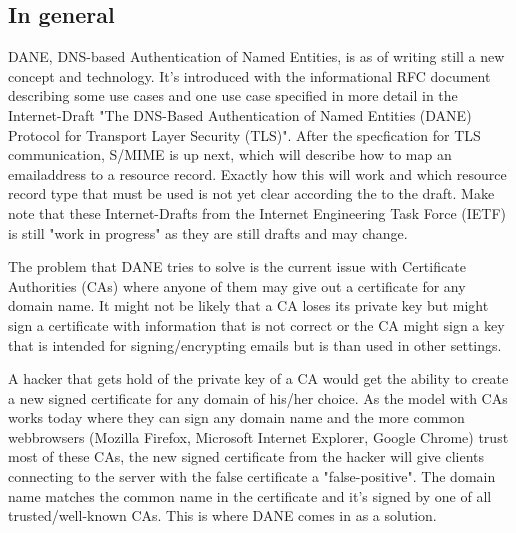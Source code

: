 \subsection{In general}
DANE, DNS-based Authentication of Named Entities, is as of writing still a new concept and technology.
It's introduced with the informational RFC document\cite{rfc:6394} describing some use cases and one use case specified in more detail in the Internet-Draft "The DNS-Based Authentication of Named Entities (DANE) Protocol for Transport Layer Security (TLS)"\cite{rfc:draft-dane}.
After the specfication for TLS communication, S/MIME is up next, which will describe how to map an emailaddress to a resource record.
Exactly how this will work and which resource record type that must be used is not yet clear according the to the draft\cite{rfc:draft-smime}.
Make note that these Internet-Drafts from the Internet Engineering Task Force (IETF) is still "work in progress" as they are still drafts and may change.

The problem that DANE tries to solve is the current issue with Certificate Authorities (CAs) where anyone of them may give out a certificate for any domain name.
It might not be likely that a CA loses its private key but might sign a certificate with information that is not correct or the CA might sign a key that is intended for signing/encrypting emails but is than used in other settings.

A hacker that gets hold of the private key of a CA would get the ability to create a new signed certificate for any domain of his/her choice.
As the model with CAs works today where they can sign any domain name and the more common webbrowsers (Mozilla Firefox, Microsoft Internet Explorer, Google Chrome) trust most of these CAs, the new signed certificate from the hacker will give clients connecting to the server with the false certificate a "false-positive".
The domain name matches the common name in the certificate and it's signed by one of all trusted/well-known CAs.
This is where DANE comes in as a solution.

